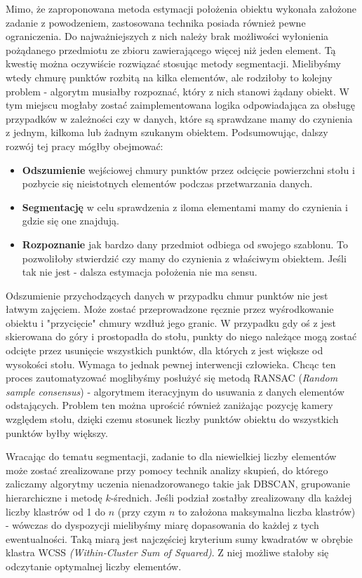 \documentclass{article}
\begin{document}
Mimo, że zaproponowana metoda estymacji położenia obiektu wykonała założone zadanie z powodzeniem, zastosowana technika posiada również pewne ograniczenia. Do najważniejszych z nich należy brak możliwości wyłonienia pożądanego przedmiotu ze zbioru zawierającego więcej niż jeden element. Tą kwestię można oczywiście rozwiązać stosując metody segmentacji. Mielibyśmy wtedy chmurę punktów rozbitą na kilka elementów, ale rodziłoby to kolejny problem - algorytm musiałby rozpoznać, który z nich stanowi żądany obiekt. W tym miejscu mogłaby zostać zaimplementowana logika odpowiadająca za obsługę przypadków w zależności czy w danych, które są sprawdzane mamy do czynienia z jednym, kilkoma lub żadnym szukanym obiektem. Podsumowując, dalszy rozwój tej pracy mógłby obejmować:

\begin{itemize}
\item \textbf{Odszumienie} wejściowej chmury punktów przez odcięcie powierzchni stołu i pozbycie się nieistotnych elementów podczas przetwarzania danych.

\item \textbf{Segmentację} w celu sprawdzenia z iloma elementami mamy do czynienia i gdzie się one znajdują.

\item \textbf{Rozpoznanie} jak bardzo dany przedmiot odbiega od swojego szablonu. To pozwoliłoby stwierdzić czy mamy do czynienia z właściwym obiektem. Jeśli tak nie jest - dalsza estymacja położenia nie ma sensu.
\end{itemize}

Odszumienie przychodzących danych w przypadku chmur punktów nie jest łatwym zajęciem. Może zostać przeprowadzone ręcznie przez wyśrodkowanie obiektu i "przycięcie" chmury wzdłuż jego granic. W przypadku gdy oś z jest skierowana do góry i prostopadła do stołu, punkty do niego należące mogą zostać odcięte przez usunięcie wszystkich punktów, dla których z jest większe od wysokości stołu. Wymaga to jednak pewnej interwencji człowieka. Chcąc ten proces zautomatyzować moglibyśmy posłużyć się metodą RANSAC (\emph{Random sample consensus}) - algorytmem iteracyjnym do usuwania z danych elementów odstających. Problem ten można uprościć również zaniżając pozycję kamery względem stołu, dzięki czemu stosunek liczby punktów obiektu do wszystkich punktów byłby większy. 

Wracając do tematu segmentacji, zadanie to dla niewielkiej liczby elementów może zostać zrealizowane przy pomocy technik analizy skupień, do którego zaliczamy algorytmy uczenia nienadzorowanego takie jak DBSCAN, grupowanie hierarchiczne i metodę $k$-średnich. Jeśli podział zostałby zrealizowany dla każdej liczby klastrów od 1 do $n$ (przy czym $n$ to założona maksymalna liczba klastrów) - wówczas do dyspozycji mielibyśmy miarę dopasowania do każdej z tych ewentualności. Taką miarą jest najczęściej kryterium sumy kwadratów w obrębie klastra WCSS \emph{(Within-Cluster Sum of Squared)}. Z niej możliwe stałoby się odczytanie optymalnej liczby elementów. 
\end{document}
